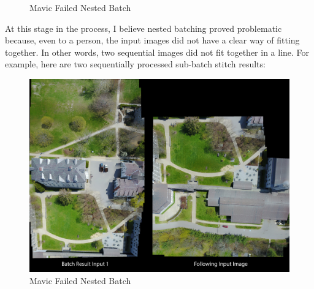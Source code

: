 \begin{figure}[htbp]
\caption{Mavic Failed Nested Batch}
\end{figure}

At this stage in the process, I believe nested batching proved problematic because, even to a person, the input images did not have a clear way of fitting together. In other words, two sequential images did not fit together in a line. For example, here are two sequentially processed sub-batch stitch results:

\begin{figure}[htbp]
\centering
\includegraphics[keepaspectratio,width=\textwidth,height=0.75\textheight]{images/mavic_batches/problematic_sub_stitching.jpg}
\caption{Mavic Failed Nested Batch}
\end{figure}

